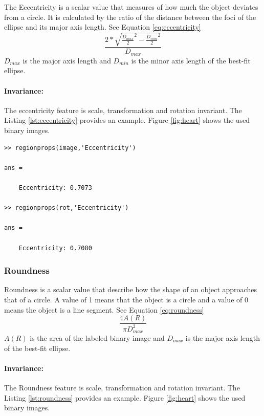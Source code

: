 \documentclass[a4paper,psfig,subfigure,epsfig,fleqn,amssmb,float,caption,fontenc,ausarbeitung]{article}
\begin{document}
The Eccentricity is a scalar value that measures of how much the object 
deviates from a circle. It is calculated by the ratio of the distance between 
the foci of the ellipse and its major axis length. See Equation 
\ref{eq:eccentricity}
\begin{equation}
	\frac{2*\sqrt{\frac{D_{max}}{2}^2-\frac{D_{min}}{2}^2}}{D_{max}}
	\label{eq:eccentricity}
\end{equation}
$D_{max}$ is the major axis length and $D_{min}$ is the minor axis length of 
the best-fit ellipse.

\paragraph{Invariance:} The eccentricity feature is scale, transformation and 
rotation invariant. The Listing \ref{lst:eccentricity} provides an example. 
Figure \ref{fig:heart} shows the used binary images.

\begin{lstlisting}[caption=Calculate eccentricity in matlab, label=lst:eccentricity]
>> regionprops(image,'Eccentricity')

ans = 

    Eccentricity: 0.7073

>> regionprops(rot,'Eccentricity')

ans = 

    Eccentricity: 0.7080
\end{lstlisting}

\subsubsection{Roundness}
\label{sec:roundness}

Roundness is a scalar value that describe how the shape of an object 
approaches that of a circle. A value of 1 means that the object is a circle 
and a value of 0 means the object is a line segment. See Equation \ref{eq:roundness}
\begin{equation}
  \frac{4A(R)}{\pi D^{2}_{max}}
	\label{eq:roundness}
\end{equation}
$A(R)$ is the area of the labeled binary image and $D_{max}$ is the major axis 
length of the best-fit ellipse.

\paragraph{Invariance:} The Roundness feature is scale, transformation and 
rotation invariant. The Listing \ref{lst:roundness} provides an example. 
Figure \ref{fig:heart} shows the used binary images.
\end{document}
